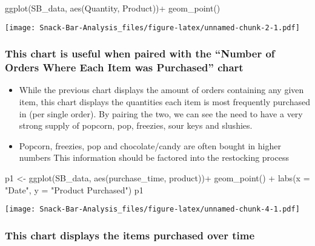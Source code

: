 \documentclass[
]{article}
\newenvironment{Shaded}{\begin{snugshade}}{\end{snugshade}}
\newcommand{\AttributeTok}[1]{\textcolor[rgb]{0.77,0.63,0.00}{#1}}
\newcommand{\FunctionTok}[1]{\textcolor[rgb]{0.00,0.00,0.00}{#1}}
\newcommand{\NormalTok}[1]{#1}
\newcommand{\OtherTok}[1]{\textcolor[rgb]{0.56,0.35,0.01}{#1}}
\newcommand{\SpecialCharTok}[1]{\textcolor[rgb]{0.00,0.00,0.00}{#1}}
\newcommand{\StringTok}[1]{\textcolor[rgb]{0.31,0.60,0.02}{#1}}
\begin{document}
\begin{Shaded}
\begin{Highlighting}[]
\FunctionTok{ggplot}\NormalTok{(SB\_data, }\FunctionTok{aes}\NormalTok{(Quantity, Product))}\SpecialCharTok{+}
  \FunctionTok{geom\_point}\NormalTok{()}
\end{Highlighting}
\end{Shaded}

\texttt{[image: Snack-Bar-Analysis\_files/figure-latex/unnamed-chunk-2-1.pdf]}

\hypertarget{this-chart-is-useful-when-paired-with-the-number-of-orders-where-each-item-was-purchased-chart}{%
\subsubsection{This chart is useful when paired with the ``Number of
Orders Where Each Item was Purchased''
chart}\label{this-chart-is-useful-when-paired-with-the-number-of-orders-where-each-item-was-purchased-chart}}

\begin{itemize}
\item
  While the previous chart displays the amount of orders containing any
  given item, this chart displays the quantities each item is most
  frequently purchased in (per single order). By pairing the two, we can
  see the need to have a very strong supply of popcorn, pop, freezies,
  sour keys and slushies.
\item
  Popcorn, freezies, pop and chocolate/candy are often bought in higher
  numbers This information should be factored into the restocking
  process
\end{itemize}

\begin{Shaded}
\begin{Highlighting}[]
\NormalTok{p1 }\OtherTok{\textless{}{-}} \FunctionTok{ggplot}\NormalTok{(SB\_data, }\FunctionTok{aes}\NormalTok{(purchase\_time, product))}\SpecialCharTok{+}
  \FunctionTok{geom\_point}\NormalTok{() }\SpecialCharTok{+} \FunctionTok{labs}\NormalTok{(}\AttributeTok{x =} \StringTok{"Date"}\NormalTok{, }\AttributeTok{y =} \StringTok{"Product Purchased"}\NormalTok{)}
\NormalTok{p1}
\end{Highlighting}
\end{Shaded}

\texttt{[image: Snack-Bar-Analysis\_files/figure-latex/unnamed-chunk-4-1.pdf]}

\hypertarget{this-chart-displays-the-items-purchased-over-time}{%
\subsubsection{This chart displays the items purchased over
time}\label{this-chart-displays-the-items-purchased-over-time}}
\end{document}
